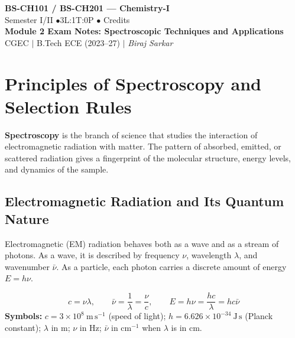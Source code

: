 \documentclass[12pt,a4paper]{article}
\begin{document}
\begin{center}
  {\LARGE\bfseries\color{myred} BS-CH101 / BS-CH201 --- Chemistry-I}\\[5pt]
  {\normalsize\color{mydark} Semester I/II \quad$\bullet$\quad 3L:1T:0P \quad$\bullet$ Credits}\\[3pt]
  {\normalsize\color{myteal}\textbf{Module 2 Exam Notes: Spectroscopic Techniques and Applications}}\\[3pt]
  {\small\color{mydark} CGEC \;$|$\; B.Tech ECE (2023--27) \;$|$\; \textit{Biraj Sarkar}}
\end{center}
\vspace{2pt}
\noindent{\color{myred}\rule{\linewidth}{1.5pt}}
\vspace{2pt}

\hypersetup{linkcolor=mydark}
\tableofcontents
\hypersetup{linkcolor=myteal}
\newpage
\section{Principles of Spectroscopy and Selection Rules}

\begin{tcolorbox}[defbox]
\textbf{Spectroscopy} is the branch of science that studies the interaction of electromagnetic radiation with matter. The pattern of absorbed, emitted, or scattered radiation gives a fingerprint of the molecular structure, energy levels, and dynamics of the sample.
\end{tcolorbox}

\subsection{Electromagnetic Radiation and Its Quantum Nature}
Electromagnetic (EM) radiation behaves both as a wave and as a stream of photons. As a wave, it is described by frequency $\nu$, wavelength $\lambda$, and wavenumber $\bar{\nu}$. As a particle, each photon carries a discrete amount of energy $E=h\nu$.

\begin{tcolorbox}[formulabox, title={Wave--Particle Relations}]
\[
c = \nu\lambda, \qquad \bar{\nu}=\frac{1}{\lambda}=\frac{\nu}{c}, \qquad E=h\nu=\frac{hc}{\lambda}=hc\bar{\nu}
\]
\textbf{Symbols:} $c=3\times10^{8}\ \mathrm{m\,s^{-1}}$ (speed of light); $h=6.626\times10^{-34}\ \mathrm{J\,s}$ (Planck constant); $\lambda$ in m; $\nu$ in Hz; $\bar{\nu}$ in $\mathrm{cm^{-1}}$ when $\lambda$ is in cm.
\end{tcolorbox}
\end{document}
